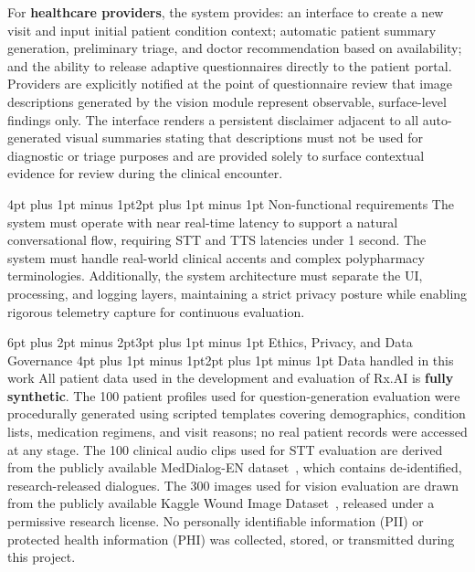 \documentclass[sigplan,screen]{acmart}
\makeatletter
\renewcommand{\section}{\@startsection{section}{1}{\z@}
  {6pt plus 2pt minus 2pt}{3pt plus 1pt minus 1pt}
  {\normalfont\large\bfseries}}
\renewcommand{\subsection}{\@startsection{subsection}{2}{\z@}
  {4pt plus 1pt minus 1pt}{2pt plus 1pt minus 1pt}
  {\normalfont\normalsize\bfseries}}
\makeatother
\begin{document}
For \textbf{healthcare providers}, the system provides: an interface to create a new visit and input initial patient condition context; automatic patient summary generation, preliminary triage, and doctor recommendation based on availability; and the ability to release adaptive questionnaires directly to the patient portal. Providers are explicitly notified at the point of questionnaire review that
image descriptions generated by the vision module represent observable,
surface-level findings only. The interface renders a persistent disclaimer
adjacent to all auto-generated visual summaries stating that descriptions
must not be used for diagnostic or triage purposes and are provided solely
to surface contextual evidence for review during the clinical encounter.

\subsection{Non-functional requirements}
The system must operate with near real-time latency to support a natural conversational flow, requiring STT and TTS latencies under 1 second. The system must handle real-world clinical accents and complex polypharmacy terminologies. Additionally, the system architecture must separate the UI, processing, and logging layers, maintaining a strict privacy posture while enabling rigorous telemetry capture for continuous evaluation.

\section{Ethics, Privacy, and Data Governance}
\label{sec:ethics}
\subsection{Data handled in this work}
All patient data used in the development and evaluation of Rx.AI is
\textbf{fully synthetic}. The 100 patient profiles used for question-generation
evaluation were procedurally generated using scripted templates covering
demographics, condition lists, medication regimens, and visit reasons; no real
patient records were accessed at any stage. The 100 clinical audio clips used
for STT evaluation are derived from the publicly available MedDialog-EN
dataset~\cite{meddialog}, which contains de-identified, research-released
dialogues. The 300 images used for vision evaluation are drawn from the publicly
available Kaggle Wound Image Dataset~\cite{wounddataset}, released under a
permissive research license. No personally identifiable information (PII) or
protected health information (PHI) was collected, stored, or transmitted during
this project.
\end{document}
